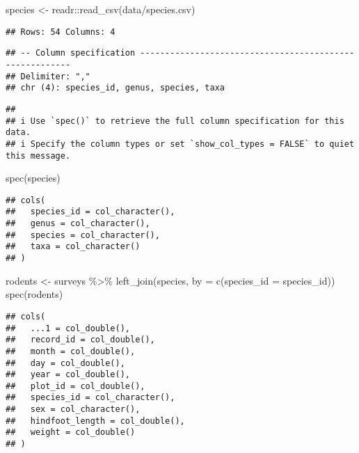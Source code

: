 \documentclass[
]{article}
\newenvironment{Shaded}{\begin{snugshade}}{\end{snugshade}}
\newcommand{\AttributeTok}[1]{\textcolor[rgb]{0.77,0.63,0.00}{#1}}
\newcommand{\FunctionTok}[1]{\textcolor[rgb]{0.00,0.00,0.00}{#1}}
\newcommand{\NormalTok}[1]{#1}
\newcommand{\OtherTok}[1]{\textcolor[rgb]{0.56,0.35,0.01}{#1}}
\newcommand{\SpecialCharTok}[1]{\textcolor[rgb]{0.00,0.00,0.00}{#1}}
\newcommand{\StringTok}[1]{\textcolor[rgb]{0.31,0.60,0.02}{#1}}
\begin{document}
\begin{Shaded}
\begin{Highlighting}[]
\NormalTok{species }\OtherTok{\textless{}{-}}\NormalTok{ readr}\SpecialCharTok{::}\FunctionTok{read\_csv}\NormalTok{(}\StringTok{\textquotesingle{}data/species.csv\textquotesingle{}}\NormalTok{)}
\end{Highlighting}
\end{Shaded}

\begin{verbatim}
## Rows: 54 Columns: 4
\end{verbatim}

\begin{verbatim}
## -- Column specification --------------------------------------------------------
## Delimiter: ","
## chr (4): species_id, genus, species, taxa
\end{verbatim}

\begin{verbatim}
## 
## i Use `spec()` to retrieve the full column specification for this data.
## i Specify the column types or set `show_col_types = FALSE` to quiet this message.
\end{verbatim}

\begin{Shaded}
\begin{Highlighting}[]
\FunctionTok{spec}\NormalTok{(species)}
\end{Highlighting}
\end{Shaded}

\begin{verbatim}
## cols(
##   species_id = col_character(),
##   genus = col_character(),
##   species = col_character(),
##   taxa = col_character()
## )
\end{verbatim}

\begin{Shaded}
\begin{Highlighting}[]
\NormalTok{rodents }\OtherTok{\textless{}{-}}\NormalTok{ surveys }\SpecialCharTok{\%\textgreater{}\%} \FunctionTok{left\_join}\NormalTok{(species, }\AttributeTok{by =} \FunctionTok{c}\NormalTok{(}\StringTok{\textquotesingle{}species\_id\textquotesingle{}} \OtherTok{=} \StringTok{\textquotesingle{}species\_id\textquotesingle{}}\NormalTok{))}
\FunctionTok{spec}\NormalTok{(rodents)}
\end{Highlighting}
\end{Shaded}

\begin{verbatim}
## cols(
##   ...1 = col_double(),
##   record_id = col_double(),
##   month = col_double(),
##   day = col_double(),
##   year = col_double(),
##   plot_id = col_double(),
##   species_id = col_character(),
##   sex = col_character(),
##   hindfoot_length = col_double(),
##   weight = col_double()
## )
\end{verbatim}
\end{document}
